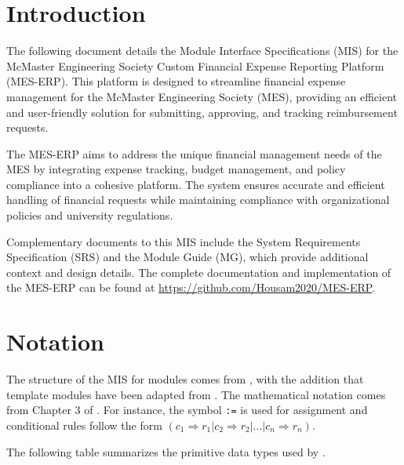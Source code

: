 \documentclass[12pt, titlepage]{article}
\begin{document}

\newpage

\tableofcontents

\newpage


\section{Introduction}

The following document details the Module Interface Specifications (MIS) for the McMaster Engineering Society Custom Financial Expense Reporting Platform (MES-ERP). This platform is designed to streamline financial expense management for the McMaster Engineering Society (MES), providing an efficient and user-friendly solution for submitting, approving, and tracking reimbursement requests.

The MES-ERP aims to address the unique financial management needs of the MES by integrating expense tracking, budget management, and policy compliance into a cohesive platform. The system ensures accurate and efficient handling of financial requests while maintaining compliance with organizational policies and university regulations.

Complementary documents to this MIS include the System Requirements Specification (SRS) and the Module Guide (MG), which provide additional context and design details. The complete documentation and implementation of the MES-ERP can be found at \url{https://github.com/Housam2020/MES-ERP}.


\section{Notation}

The structure of the MIS for modules comes from \citet{HoffmanAndStrooper1995},
with the addition that template modules have been adapted from
\cite{GhezziEtAl2003}. The mathematical notation comes from Chapter 3 of
\citet{HoffmanAndStrooper1995}. For instance, the symbol \texttt{:=} is used for assignment and conditional rules follow the form $(c_1 \Rightarrow r_1 | c_2 \Rightarrow r_2 | ... | c_n \Rightarrow r_n )$.

The following table summarizes the primitive data types used by \progname{}.
\end{document}
